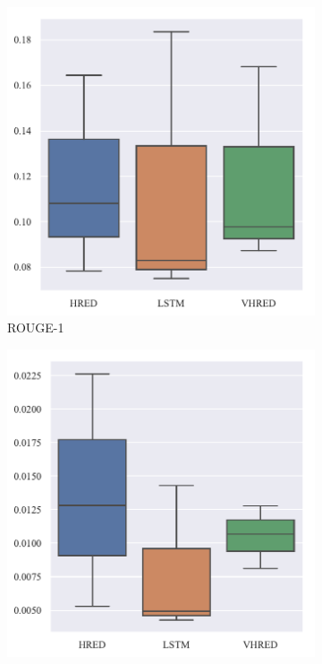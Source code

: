 \begin{figure}[H]
    \begin{subfigure}{0.5\linewidth}
        \centering
        \includegraphics[width=\linewidth]{figure/boxplot/model/rouge_1/plot.pdf}
        \caption{ROUGE-1}
    \end{subfigure}%
    \begin{subfigure}{0.5\linewidth}
        \centering
        \includegraphics[width=\linewidth]{figure/boxplot/model/rouge_2/plot.pdf}

\end{subfigure}
\end{figure}
